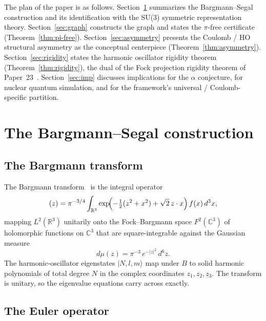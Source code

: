 \documentclass[twocolumn,pra,amsmath,amssymb,superscriptaddress]{revtex4-2}
\begin{document}
The plan of the paper is as follows.  Section~\ref{sec:bs}
summarizes the Bargmann--Segal construction and its identification
with the SU(3) symmetric representation theory.
Section~\ref{sec:graph} constructs the graph and states the
$\pi$-free certificate (Theorem~\ref{thm:pi-free}).
Section~\ref{sec:asymmetry} presents the Coulomb / HO structural
asymmetry as the conceptual centerpiece (Theorem~\ref{thm:asymmetry}).
Section~\ref{sec:rigidity} states the harmonic oscillator rigidity
theorem (Theorem~\ref{thm:rigidity}), the dual of the Fock projection
rigidity theorem of Paper~23~\cite{paper23}.  Section~\ref{sec:imp}
discusses implications for the $\alpha$ conjecture, for nuclear
quantum simulation, and for the framework's universal /
Coulomb-specific partition.

\section{The Bargmann--Segal construction}
\label{sec:bs}

\subsection{The Bargmann transform}

The Bargmann transform~\cite{bargmann1961} is the integral operator
\begin{equation}
  [B f](z) =
  \pi^{-3/4}
  \int_{\mathbb{R}^3}
  \exp\!\Bigl(
    -\tfrac{1}{2}(z^2 + x^2) + \sqrt{2}\, z \cdot x
  \Bigr)\, f(x)\, d^3 x,
  \label{eq:bargmann-kernel}
\end{equation}
mapping $L^2(\mathbb{R}^3)$ unitarily onto the
Fock--Bargmann space $F^2(\mathbb{C}^3)$ of holomorphic functions on
$\mathbb{C}^3$ that are square-integrable against the Gaussian
measure
\begin{equation}
  d\mu(z) = \pi^{-3}\, e^{-|z|^2}\, d^6 z.
  \label{eq:bargmann-measure}
\end{equation}
The harmonic-oscillator eigenstates $|N, l, m\rangle$ map under $B$
to solid harmonic polynomials of total degree $N$ in the complex
coordinates $z_1, z_2, z_3$.  The transform is unitary, so the
eigenvalue equations carry across exactly.

\subsection{The Euler operator}
\label{sec:euler}
\end{document}
